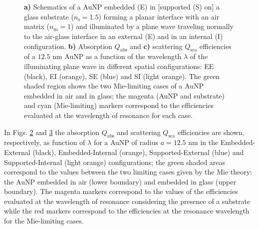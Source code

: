 \begin{figure}[b!]
    \small
    \centering
    \hspace*{-.75\textwidth}%
        \begin{subfigure}{.37\textwidth}\caption{ }\label{sfig:TotallyNormal:1}\end{subfigure}%
        \begin{subfigure}{.25\textwidth}\caption{ }\label{sfig:TotallyNormal:2}\end{subfigure} \\[6em]
    \hspace*{-.38\textwidth}%
        \begin{subfigure}{.25\textwidth}\caption{ }\label{sfig:TotallyNormal:3}\end{subfigure} \\[-9em]
    \def\svgwidth{.95\textwidth}
    \vspace*{0em}
    \caption[Absorption and Scattering Efficiencies of a 12.5 nm AuNP above and below a planar Interface Illuminated at Normal Incidence]{\textbf{a)} Schematics of a AuNP embedded (E) in [supported (S) on] a glass substrate ($n_\text{s} = 1.5$) forming a planar interface with an air matrix ($n_\text{m} = 1$) and illuminated by a plane wave traveling normally to the air-glass interface in an external (E) and in an internal (I) configuration. \textbf{b)} Absorption $Q_\text{abs}$ and \textbf{c)} scattering $Q_\text{sca}$ efficiencies of a $12.5$ nm AuNP as a function of the wavelength $\lambda$ of the illuminating plane wave in different spatial configurations: EE (black), EI (orange), SE (blue) and SI (light orange). The green shaded region shows the two Mie-limiting cases of a  AuNP embedded in air and in glass; the magenta (AuNP and substrate) and cyan (Mie-limiting) markers correspond to the efficiencies evaluated at the wavelength of resonance for each case.
    }
\label{fig:TotallyNormal}
\end{figure}

In Figs. \ref{sfig:TotallyNormal:2} and \ref{sfig:TotallyNormal:3}  the absorption $Q_\text{abs}$ and scattering $Q_\text{sca}$ efficiencies are shown, respectively, as function of $\lambda$ for a AuNP of radius $a = 12.5$ nm in the Embedded-External (black), Embedded-Internal (orange), Supported-External (blue) and Supported-Internal (light orange) configurations; the green shaded areas correspond to the values between the two limiting cases given by the Mie theory: the AuNP embedded in air (lower boundary) and embedded in glass (upper boundary). The magenta markers correspond to the values of the efficiencies evaluated at the wavelength of resonance considering the presence of a substrate while the red markers correspond to the efficiencies at the resonance wavelength for the Mie-limiting cases.


